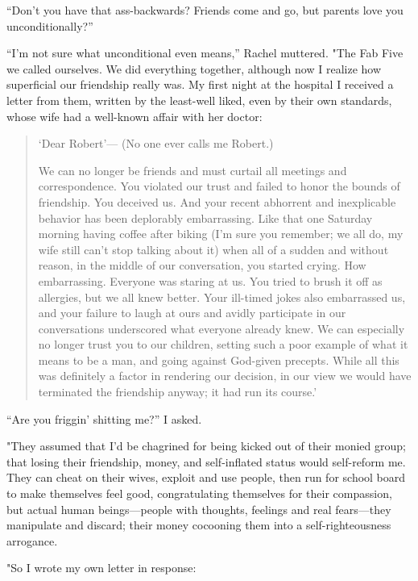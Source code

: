 ``Don't you have that ass-backwards? Friends come and go, but parents
love you unconditionally?''

``I'm not sure what unconditional even means,'' Rachel muttered. "The
Fab Five we called ourselves. We did everything together, although now I
realize how superficial our friendship really was. My first night at the
hospital I received a letter from them, written by the least-well liked,
even by their own standards, whose wife had a well-known affair with her
doctor:

\begin{quote}
`Dear Robert'--- (No one ever calls me Robert.)

We can no longer be friends and must curtail all meetings and
correspondence. You violated our trust and failed to honor the bounds of
friendship. You deceived us. And your recent abhorrent and inexplicable
behavior has been deplorably embarrassing. Like that one Saturday
morning having coffee after biking (I'm sure you remember; we all do, my
wife still can't stop talking about it) when all of a sudden and without
reason, in the middle of our conversation, you started crying. How
embarrassing. Everyone was staring at us. You tried to brush it off as
allergies, but we all knew better. Your ill-timed jokes also embarrassed
us, and your failure to laugh at ours and avidly participate in our
conversations underscored what everyone already knew. We can especially
no longer trust you to our children, setting such a poor example of what
it means to be a man, and going against God-given precepts. While all
this was definitely a factor in rendering our decision, in our view we
would have terminated the friendship anyway; it had run its course.'
\end{quote}

\noindent ``Are you friggin' shitting me?'' I asked.

"They assumed that I'd be chagrined for being kicked out of their monied
group; that losing their friendship, money, and self-inflated status
would self-reform me. They can cheat on their wives, exploit and use
people, then run for school board to make themselves feel good,
congratulating themselves for their compassion, but actual human
beings---people with thoughts, feelings and real fears---they manipulate
and discard; their money cocooning them into a self-righteousness
arrogance.

"So I wrote my own letter in response:

